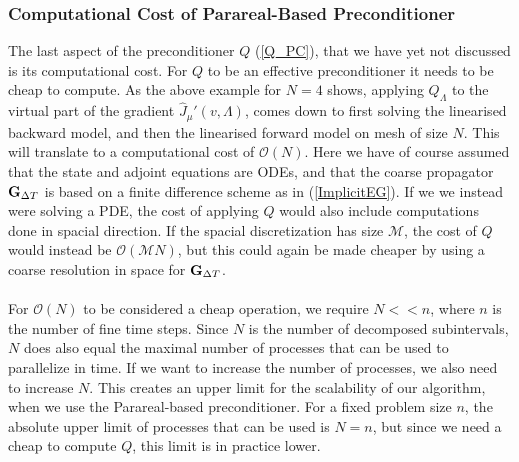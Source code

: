 \subsubsection{Computational Cost of Parareal-Based Preconditioner}
The last aspect of the preconditioner $Q$ (\ref{Q_PC}), that we have yet not discussed is its computational cost. For $Q$ to be an effective preconditioner it needs to be cheap to compute. As the above example for $N=4$ shows, applying $Q_{\Lambda}$ to the virtual part of the gradient $\hat J_{\mu}'(v,\Lambda)$, comes down to first solving the linearised backward model, and then the linearised forward model on mesh of size $N$. This will translate to a computational cost of $\mathcal{O}(N)$. Here we have of course assumed that the state and adjoint equations are ODEs, and that the coarse propagator $\bold G_{\Delta T}$ is based on a finite difference scheme as in (\ref{ImplicitEG}). If we we instead were solving a PDE, the cost of applying $Q$ would also include computations done in spacial direction. If the spacial discretization has size $\mathcal{M}$, the cost of $Q$ would instead be $\mathcal{O}(\mathcal{M}N)$, but this could again be made cheaper by using a coarse resolution in space for $\bold G_{\Delta T}$. 
\\
\\
For $\mathcal{O}(N)$ to be considered a cheap operation, we require $N<<n$, where $n$ is the number of fine time steps. Since $N$ is the number of decomposed subintervals, $N$ does also equal the maximal number of processes that can be used to parallelize in time. If we want to increase the number of processes, we also need to increase $N$. This creates an upper limit for the scalability of our algorithm, when we use the Parareal-based preconditioner. For a fixed problem size $n$, the absolute upper limit of processes that can be used is $N=n$, but since we need a cheap to compute $Q$, this limit is in practice lower.  
